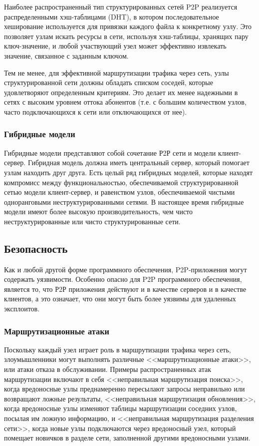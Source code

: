 \documentclass[bachelor, och, coursework]{SCWorks}
\begin{document}
Наиболее распространенный тип структурированных сетей P2P реализуется распределенными хэш-таблицами (DHT), 
в котором последовательное хеширование используется для привязки каждого файла к конкретному узлу. Это позволяет узлам искать ресурсы в сети, используя хэш-таблицы, хранящих пару ключ-значение, и любой участвующий узел может эффективно извлекать значение, связанное с заданным ключом.

Тем не менее, для эффективной маршрутизации трафика через сеть, узлы структурированной сети должны обладать списком соседей, 
которые удовлетворяют определенным критериям. 
Это делает их менее надежными в сетях с высоким уровнем оттока абонентов (т.е. с большим количеством узлов, 
часто подключающихся к сети или отключающихся от нее).

\subsubsection{Гибридные модели}
Гибридные модели представляют собой сочетание Р2Р сети и модели клиент-сервер. 
Гибридная модель должна иметь центральный сервер, который помогает узлам находить друг друга. 
Есть целый ряд гибридных моделей, которые находят компромисс между функциональностью, обеспечиваемой структурированной сетью модели клиент-сервер, 
и равенством узлов, обеспечиваемой чистыми одноранговыми неструктурированными сетями. 
В настоящее время гибридные модели имеют более высокую производительность, чем чисто неструктурированные или чисто структурированные сети.

\subsection{Безопасность}
Как и любой другой форме программного обеспечения, P2P-приложения могут содержать уязвимости. 
Особенно опасно для P2P программного обеспечения, является то, что Р2Р приложения действуют и в качестве серверов и в качестве клиентов, 
а это означает, что они могут быть более уязвимы для удаленных эксплоитов.

\subsubsection{Маршрутизационные атаки}
Поскольку каждый узел играет роль в маршрутизации трафика через сеть, злоумышленники могут выполнять различные <<маршрутизационные атаки>>, или атаки отказа в обслуживании. Примеры распространенных атак маршрутизации включают в себя <<неправильная маршрутизация поиска>>, когда вредоносные узлы преднамеренно пересылают запросы неправильно или возвращают ложные результаты, <<неправильная маршрутизация обновления>>, когда вредоносные узлы изменяют таблицы маршрутизации соседних узлов, посылая им ложную информацию, и <<неправильная маршрутизация разделения сети>>, когда новые узлы подключаются через вредоносный узел, который помещает новичков в разделе сети, заполненной другими вредоносными узлами.
\end{document}
